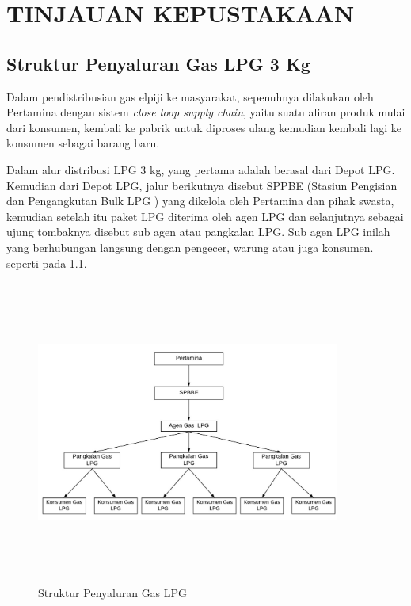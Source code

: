 
\chapter{TINJAUAN KEPUSTAKAAN}                

\section{Struktur Penyaluran Gas LPG 3 Kg}
\par Dalam pendistribusian gas elpiji ke masyarakat, sepenuhnya dilakukan oleh Pertamina dengan sistem \textit{close loop  supply chain}, yaitu suatu aliran produk mulai dari konsumen, kembali ke pabrik untuk diproses ulang kemudian kembali lagi ke konsumen sebagai barang baru.
\par Dalam alur distribusi LPG 3 kg, yang pertama adalah berasal dari Depot LPG. Kemudian dari Depot LPG, jalur berikutnya disebut SPPBE (Stasiun Pengisian dan Pengangkutan Bulk LPG ) yang dikelola oleh Pertamina dan pihak swasta, kemudian setelah itu paket LPG diterima oleh agen LPG dan selanjutnya sebagai ujung tombaknya disebut sub agen atau pangkalan LPG. Sub agen LPG inilah yang berhubungan langsung dengan pengecer, warung atau juga konsumen. seperti pada \ref{penyaluran}.
\begin{figure}[H]
	\centering
	\includegraphics [width = 10cm, height= 10cm]{gambar/struktur-penyaluran}
	\caption{Struktur Penyaluran Gas LPG}
	\label{penyaluran}
\end{figure}


